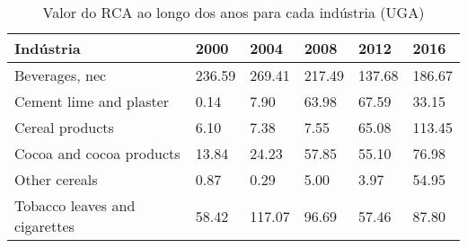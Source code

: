 \begin{table}
\centering
\caption{Valor do RCA ao longo dos anos para cada indústria (UGA)}
\begin{tabular}{p{6cm}p{1.5cm}p{1.5cm}p{1.5cm}p{1.5cm}p{1.5cm}}
\toprule
                    Indústria &   2000 &   2004 &   2008 &   2012 &   2016 \\
\midrule
               Beverages, nec & 236.59 & 269.41 & 217.49 & 137.68 & 186.67 \\
      Cement lime and plaster &   0.14 &   7.90 &  63.98 &  67.59 &  33.15 \\
              Cereal products &   6.10 &   7.38 &   7.55 &  65.08 & 113.45 \\
     Cocoa and cocoa products &  13.84 &  24.23 &  57.85 &  55.10 &  76.98 \\
                Other cereals &   0.87 &   0.29 &   5.00 &   3.97 &  54.95 \\
Tobacco leaves and cigarettes &  58.42 & 117.07 &  96.69 &  57.46 &  87.80 \\
\bottomrule
\end{tabular}
\end{table}
